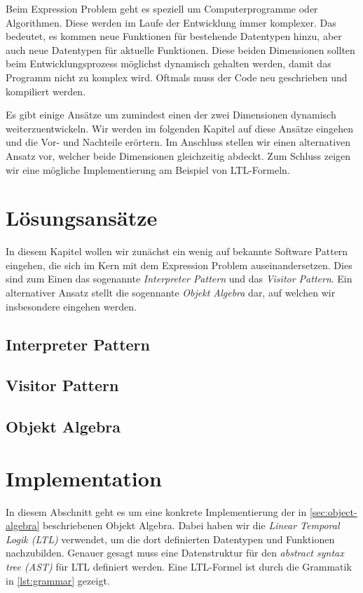 \documentclass{llncs}
\begin{document}
Beim Expression Problem geht es speziell um Computerprogramme oder Algorithmen. Diese werden im Laufe der Entwicklung immer komplexer. Das bedeutet, es kommen neue Funktionen für bestehende Datentypen hinzu, aber auch neue Datentypen für aktuelle Funktionen. Diese beiden Dimensionen sollten beim Entwicklungsprozess möglichst dynamisch gehalten werden, damit das Programm nicht zu komplex wird. Oftmals muss der Code neu geschrieben und kompiliert werden. 

Es gibt einige Ansätze um zumindest einen der zwei Dimensionen dynamisch weiterzuentwickeln. Wir werden im folgenden Kapitel auf diese Ansätze eingehen und die Vor- und Nachteile erörtern. Im Anschluss stellen wir einen alternativen Ansatz vor, welcher beide Dimensionen gleichzeitig abdeckt. Zum Schluss zeigen wir eine mögliche Implementierung am Beispiel von LTL-Formeln.   

\section{Lösungsansätze} \label{sec:approaches}

In diesem Kapitel wollen wir zunächst ein wenig auf bekannte Software Pattern eingehen, die sich im Kern mit dem Expression Problem auseinandersetzen. Dies sind zum Einen das sogenannte \emph{Interpreter Pattern} und das \emph{Visitor Pattern}. Ein alternativer Ansatz stellt die sogennante \emph{Objekt Algebra} dar, auf welchen wir insbesondere eingehen werden. 

\subsection{Interpreter Pattern} \label{sec:interpreter}

\subsection{Visitor Pattern} \label{sec:visitor}

\subsection{Objekt Algebra} \label{sec:object-algebra}

\section{Implementation} \label{sec:implementation}
In diesem Abschnitt geht es um eine konkrete Implementierung der in \autoref{sec:object-algebra} beschriebenen Objekt Algebra.
Dabei haben wir die \emph{Linear Temporal Logik (LTL)} \cite{pnueli77} verwendet, um die dort definierten Datentypen und Funktionen nachzubilden.
Genauer gesagt muss eine Datenstruktur für den \emph{abstract syntax tree (AST)} für LTL definiert werden.
Eine LTL-Formel ist durch die Grammatik in \autoref{lst:grammar} gezeigt.
\end{document}
